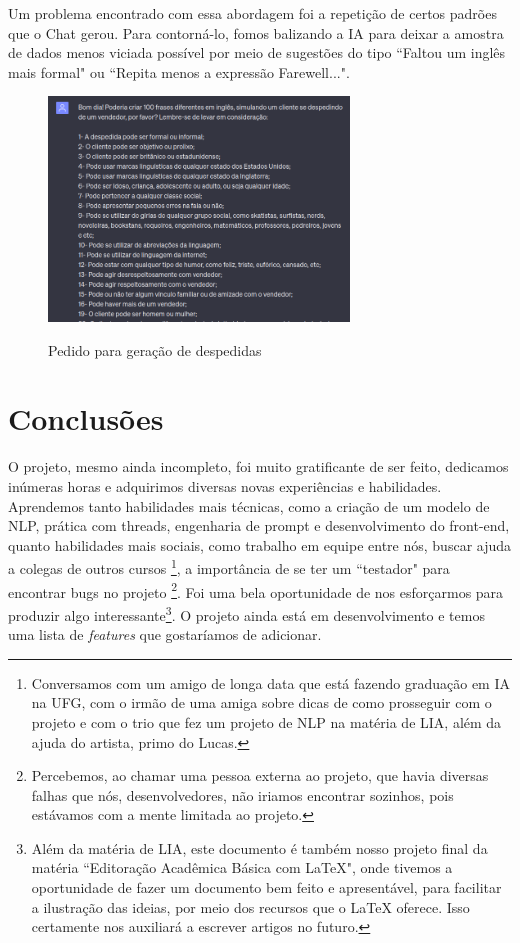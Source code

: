 \documentclass[a4paper]{article}
\begin{document}
        Um problema encontrado com essa abordagem foi a repetição de certos
        padrões que o Chat gerou. Para contorná-lo, fomos balizando a IA para
        deixar a amostra de dados menos viciada possível por meio de sugestões
        do tipo ``Faltou um inglês mais formal"  ou ``Repita menos a expressão
        Farewell...".

        \begin{figure}[!h]
            \center
            \includegraphics[width=8cm]{Dados2.png} \\
            \caption{\small{Pedido para geração de despedidas}}
        \end{figure}
        
    	
    \section{Conclusões}
        O projeto, mesmo ainda incompleto, foi muito gratificante de ser feito,
        dedicamos inúmeras horas e adquirimos diversas novas experiências e
        habilidades. Aprendemos tanto habilidades mais técnicas, como a criação
        de um modelo de NLP, prática com threads, engenharia de prompt e desenvolvimento do front-end,
        quanto habilidades mais sociais, como trabalho em equipe entre nós,
        buscar ajuda a colegas de outros cursos \footnote{Conversamos com um
        amigo de longa data que está fazendo graduação em IA na UFG, com o
        irmão de uma amiga sobre dicas de como prosseguir com o projeto e com o
        trio que fez um projeto de NLP na matéria de LIA, além da
        ajuda do artista, primo do Lucas.}, a importância de se ter um
        ``testador" para encontrar bugs no projeto \footnote{Percebemos, ao
        chamar uma pessoa externa ao projeto, que havia diversas falhas que nós,
        desenvolvedores, não iriamos encontrar sozinhos, pois estávamos com a
        mente limitada ao projeto.}. Foi uma bela oportunidade de nos
        esforçarmos para produzir algo interessante\footnote{Além da matéria de
        LIA, este documento é também nosso projeto final da matéria ``Editoração
        Acadêmica Básica com \LaTeX", onde tivemos a oportunidade de fazer um
        documento bem feito e apresentável, para facilitar a ilustração das
        ideias, por meio dos recursos que o \LaTeX{} oferece. Isso certamente
        nos auxiliará a escrever artigos no futuro.}. O projeto ainda
        está em desenvolvimento e temos uma lista de \emph{features} que
        gostaríamos de adicionar.
\end{document}
